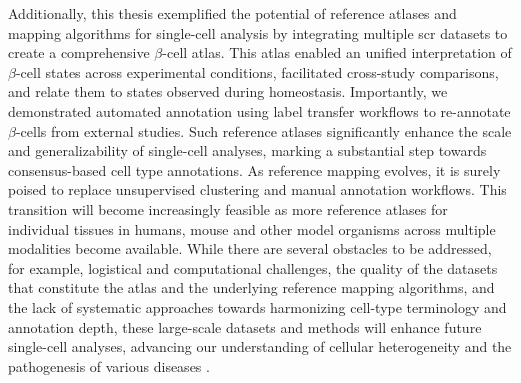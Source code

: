 \par Additionally, this thesis exemplified the potential of reference atlases and mapping algorithms for single-cell analysis by integrating multiple \gls{scr} datasets to create a comprehensive $\beta$-cell atlas. This atlas enabled an unified interpretation of $\beta$-cell states across experimental conditions, facilitated cross-study comparisons, and relate them to states observed during homeostasis. Importantly, we demonstrated automated annotation using label transfer workflows to re-annotate $\beta$-cells from external studies. Such reference atlases significantly enhance the scale and generalizability of single-cell analyses, marking a substantial step towards consensus-based cell type annotations. As reference mapping evolves, it is surely poised to replace unsupervised clustering and manual annotation workflows. This transition will become increasingly feasible as more reference atlases for individual tissues in humans, mouse and other model organisms across multiple modalities become available. While there are several obstacles to be addressed, for example, logistical and computational challenges, the quality of the datasets that constitute the atlas and the underlying reference mapping algorithms, and the lack of systematic approaches towards harmonizing cell-type terminology and annotation depth, these large-scale datasets and methods will enhance future single-cell analyses, advancing our understanding of cellular heterogeneity and the pathogenesis of various diseases \textbf{\cite{lotfollahi_mapping_2021,lotfollahi_future_2024}}.\\ 


